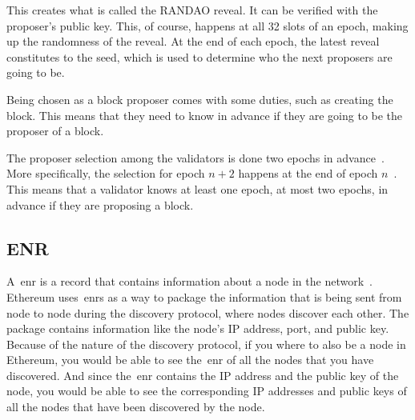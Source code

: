 This creates what is called the RANDAO reveal.
It can be verified with the proposer's public key.
This, of course, happens at all 32 slots of an epoch, making up the randomness of the reveal.
At the end of each epoch, the latest reveal constitutes to the seed, which is used to determine who the next proposers are going to be.


Being chosen as a block proposer comes with some duties, such as creating the block.
This means that they need to know in advance if they are going to be the proposer of a block.

The proposer selection among the validators is done two epochs in advance~\cite{random-selection}.
More specifically, the selection for epoch $n+2$ happens at the end of epoch $n$~\cite{upgrading-ethereum-randomness}.
This means that a validator knows at least one epoch, at most two epochs, in advance if they are proposing a block.


\subsection{ENR}\label{subsec:enr}
A~\gls{enr} is a record that contains information about a node in the network~\cite{EIP-778:Ethereum-Node-Records}.
Ethereum uses~\glspl{enr} as a way
to package the information that is being sent from node to node during the discovery protocol,
where nodes discover each other.
The package contains information like the node's IP address, port, and public key.
Because of the nature of the discovery protocol, if you where to also be a node in Ethereum,
you would be able to see the~\gls{enr} of all the nodes that you have discovered.
And since the~\gls{enr} contains the IP address and the public key of the node,
you would be able
to see the corresponding IP addresses and public keys of all the nodes that have been discovered by the node.


